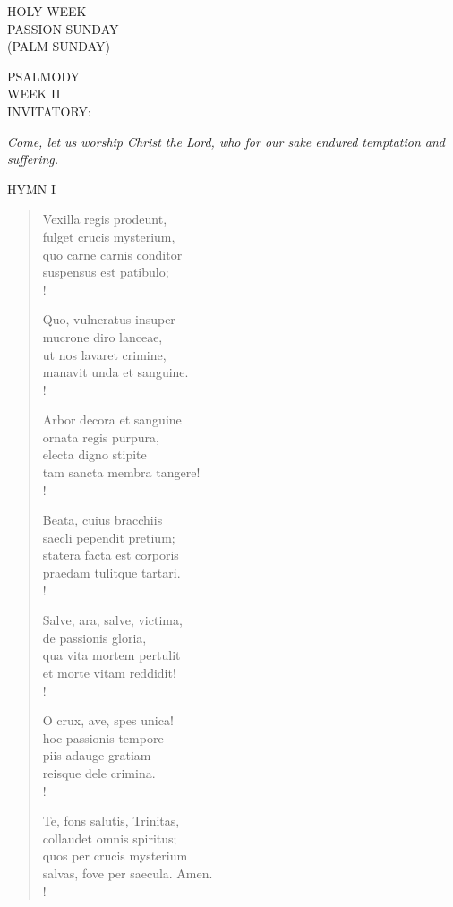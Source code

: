 \begin{center}\normalsize HOLY WEEK\\
PASSION SUNDAY\\
\footnotesize {(PALM SUNDAY)}
\end{center}

\noindent\small{\uppercase{PSALMODY}\\} WEEK II\\
\noindent\small{\uppercase{INVITATORY:}}\normalsize
\begin{center}
\textit{Come, let us worship Christ the Lord, who for our sake endured temptation and suffering.\\}
\end{center}
\noindent\small{\uppercase{Hymn I}}\normalsize\label{palmsunday:firstHymn}
\begin{verse}
Vexilla regis prodeunt,\\
fulget crucis mysterium,\\
quo carne carnis conditor\\
suspensus est patibulo;\\!

Quo, vulneratus insuper \\
mucrone diro lanceae,\\
ut nos lavaret crimine,\\
manavit unda et sanguine.\\!

Arbor decora et sanguine\\
ornata regis purpura,\\
electa digno stipite\\
tam sancta membra tangere!\\!

Beata, cuius bracchiis\\
saecli pependit pretium;\\
statera facta est corporis\\
praedam tulitque tartari.\\!

Salve, ara, salve, victima,\\
de passionis gloria,\\
qua vita mortem pertulit\\
et morte vitam reddidit!\\!

O crux, ave, spes unica!\\
hoc passionis tempore\\
piis adauge gratiam\\
reisque dele crimina.\\!

Te, fons salutis, Trinitas,\\
collaudet omnis spiritus;\\
quos per crucis mysterium\\
salvas, fove per saecula. Amen.\\!
\end{verse}

